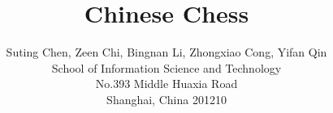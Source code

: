 \documentclass[letterpaper]{article}
\title{Chinese Chess}
\author{Suting Chen, Zeen Chi, Bingnan Li, Zhongxiao Cong, Yifan Qin\\
School of Information Science and Technology\\
No.393 Middle Huaxia Road\\
Shanghai, China 201210\\
}
\begin{document}
\maketitle
\begin{abstract}
\begin{quote}

\end{quote}
\end{abstract}
\end{document}
